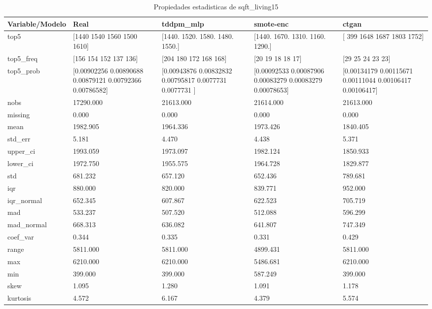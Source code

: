 \begin{table}[H]
\centering
\caption{Propiedades  estadisticas de sqft_living15}
\label{table-stats-sqft_living15}
\begin{tabular}{|l|m{10em}|m{10em}|m{10em}|m{10em}|}
\hline
 \rowcolor[gray]{0.8}
Variable/Modelo & Real & tddpm\_mlp & smote-enc & ctgan \\
\hline top5 & [1440 1540 1560 1500 1610] & [1440. 1520. 1580. 1480. 1550.] & [1440. 1670. 1310. 1160. 1290.] & [ 399 1648 1687 1803 1752] \\
\hline top5\_freq & [156 154 152 137 136] & [204 180 172 168 168] & [20 19 18 18 17] & [29 25 24 23 23] \\
\hline top5\_prob & [0.00902256 0.00890688 0.00879121 0.00792366 0.00786582] & [0.00943876 0.00832832 0.00795817 0.0077731  0.0077731 ] & [0.00092533 0.00087906 0.00083279 0.00083279 0.00078653] & [0.00134179 0.00115671 0.00111044 0.00106417 0.00106417] \\
\hline nobs & 17290.000 & 21613.000 & 21614.000 & 21613.000 \\
\hline missing & 0.000 & 0.000 & 0.000 & 0.000 \\
\hline mean & 1982.905 & 1964.336 & 1973.426 & 1840.405 \\
\hline std\_err & 5.181 & 4.470 & 4.438 & 5.371 \\
\hline upper\_ci & 1993.059 & 1973.097 & 1982.124 & 1850.933 \\
\hline lower\_ci & 1972.750 & 1955.575 & 1964.728 & 1829.877 \\
\hline std & 681.232 & 657.120 & 652.436 & 789.681 \\
\hline iqr & 880.000 & 820.000 & 839.771 & 952.000 \\
\hline iqr\_normal & 652.345 & 607.867 & 622.523 & 705.719 \\
\hline mad & 533.237 & 507.520 & 512.088 & 596.299 \\
\hline mad\_normal & 668.313 & 636.082 & 641.807 & 747.349 \\
\hline coef\_var & 0.344 & 0.335 & 0.331 & 0.429 \\
\hline range & 5811.000 & 5811.000 & 4899.431 & 5811.000 \\
\hline max & 6210.000 & 6210.000 & 5486.681 & 6210.000 \\
\hline min & 399.000 & 399.000 & 587.249 & 399.000 \\
\hline skew & 1.095 & 1.280 & 1.091 & 1.178 \\
\hline kurtosis & 4.572 & 6.167 & 4.379 & 5.574 \\

\end{tabular}
\end{table}

